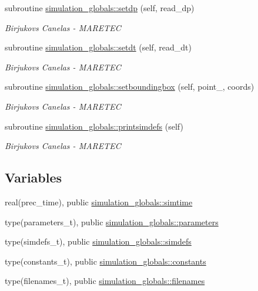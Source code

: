 \begin{DoxyCompactItemize}
subroutine \hyperlink{namespacesimulation__globals_a9a8e88c06937b7cf6be9d9bf30f54ba9}{simulation\+\_\+globals\+::setdp} (self, read\+\_\+dp)
\begin{DoxyCompactList}\small\item\em Birjukovs Canelas -\/ M\+A\+R\+E\+T\+EC \end{DoxyCompactList}\item 
subroutine \hyperlink{namespacesimulation__globals_a3ef0462db5a60ac79304cabd2fdd914d}{simulation\+\_\+globals\+::setdt} (self, read\+\_\+dt)
\begin{DoxyCompactList}\small\item\em Birjukovs Canelas -\/ M\+A\+R\+E\+T\+EC \end{DoxyCompactList}\item 
subroutine \hyperlink{namespacesimulation__globals_a1fc4653684d73efecdbd140b6cafe541}{simulation\+\_\+globals\+::setboundingbox} (self, point\+\_\+, coords)
\begin{DoxyCompactList}\small\item\em Birjukovs Canelas -\/ M\+A\+R\+E\+T\+EC \end{DoxyCompactList}\item 
subroutine \hyperlink{namespacesimulation__globals_ad90d6959da1d43e2cd1febff82187ed5}{simulation\+\_\+globals\+::printsimdefs} (self)
\begin{DoxyCompactList}\small\item\em Birjukovs Canelas -\/ M\+A\+R\+E\+T\+EC \end{DoxyCompactList}\end{DoxyCompactItemize}
\subsection*{Variables}
\begin{DoxyCompactItemize}
\item 
real(prec\+\_\+time), public \hyperlink{namespacesimulation__globals_a10daac198c63b06f99ec0c01b614a352}{simulation\+\_\+globals\+::simtime}
\item 
type(parameters\+\_\+t), public \hyperlink{namespacesimulation__globals_ac23e87cbb2256792d683ab1bf5dc5e21}{simulation\+\_\+globals\+::parameters}
\item 
type(simdefs\+\_\+t), public \hyperlink{namespacesimulation__globals_ae851f977b442737307cd4bb76f2f68be}{simulation\+\_\+globals\+::simdefs}
\item 
type(constants\+\_\+t), public \hyperlink{namespacesimulation__globals_aa3e1a54abbb08d2c09978a3509ec4303}{simulation\+\_\+globals\+::constants}
\item 
type(filenames\+\_\+t), public \hyperlink{namespacesimulation__globals_ada5ae97821ffcb77674c3470431101e3}{simulation\+\_\+globals\+::filenames}
\end{DoxyCompactItemize}
